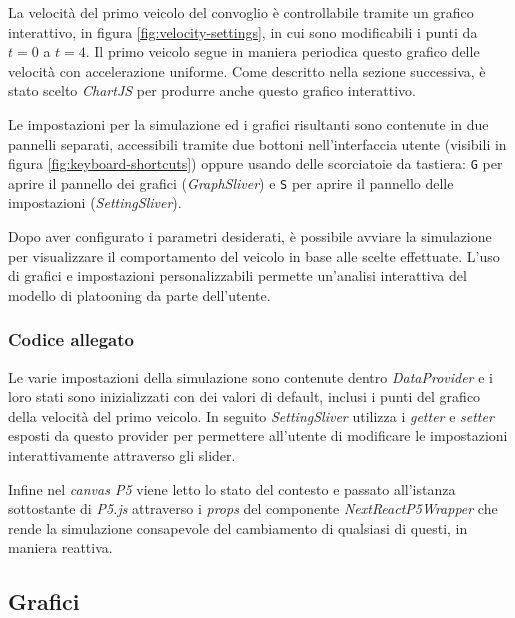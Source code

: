 La velocità del primo veicolo del convoglio è controllabile tramite un grafico interattivo, in figura \ref{fig:velocity-settings}, in cui sono modificabili i punti da $t=0$ a $t=4$. Il primo veicolo segue in maniera periodica questo grafico delle velocità con accelerazione uniforme. Come descritto nella sezione successiva, è stato scelto \textit{ChartJS} per produrre anche questo grafico interattivo.

Le impostazioni per la simulazione ed i grafici risultanti sono contenute in due pannelli separati, accessibili tramite due bottoni nell'interfaccia utente (visibili in figura \ref{fig:keyboard-shortcuts}) oppure usando delle scorciatoie da tastiera: \texttt{G} per aprire il pannello dei grafici (\textit{GraphSliver}) e \texttt{S} per aprire il pannello delle impostazioni (\textit{SettingSliver}).

Dopo aver configurato i parametri desiderati, è possibile avviare la simulazione per visualizzare il comportamento del veicolo in base alle scelte effettuate. L'uso di grafici e impostazioni personalizzabili permette un'analisi interattiva del modello di platooning da parte dell'utente.

\newpage
\subsubsection*{Codice allegato}

\vspace{0.3em}

\vspace{0.6em}

Le varie impostazioni della simulazione sono contenute dentro \textit{DataProvider} e i loro stati sono inizializzati con dei valori di default, inclusi i punti del grafico della velocità del primo veicolo. In seguito \textit{SettingSliver} utilizza i \textit{getter} e \textit{setter} esposti da questo provider per permettere all'utente di modificare le impostazioni interattivamente attraverso gli slider.

Infine nel \textit{canvas P5} viene letto lo stato del contesto e passato all'istanza sottostante di \textit{P5.js} attraverso i \textit{props} del componente \textit{NextReactP5Wrapper} che rende la simulazione consapevole del cambiamento di qualsiasi di questi, in maniera reattiva.

\newpage
\subsection{Grafici}

